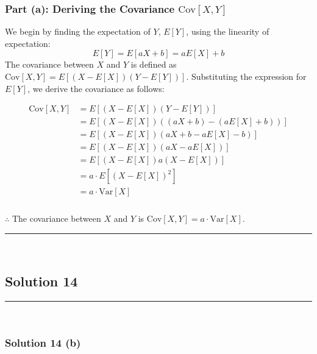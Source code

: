 \documentclass{article}
\begin{document}
\subsubsection*{Part (a): Deriving the Covariance $\text{Cov}[X, Y]$}
\parbox{\textwidth}{
We begin by finding the expectation of $Y$, $E[Y]$, using the linearity of expectation:
$$ E[Y] = E[aX + b] = aE[X] + b $$
The covariance between $X$ and $Y$ is defined as $\text{Cov}[X, Y] = E[(X - E[X])(Y - E[Y])]$. Substituting the expression for $E[Y]$, we derive the covariance as follows:
}
\begin{align*}
\text{Cov}[X, Y] &= E\left[ (X - E[X])(Y - E[Y]) \right] \\
&= E\left[ (X - E[X])((aX + b) - (aE[X] + b)) \right] \\
&= E\left[ (X - E[X])(aX + b - aE[X] - b) \right] \\
&= E\left[ (X - E[X])(aX - aE[X]) \right] \\
&= E\left[ (X - E[X])a(X - E[X]) \right] \\
&= a \cdot E\left[ (X - E[X])^2 \right] \\
&= a \cdot \text{Var}[X]
\end{align*}

\subsubsection*{\normalfont}{$\therefore$ The covariance between $X$ and $Y$ is $\text{Cov}[X, Y] = a \cdot \text{Var}[X]$.}


\noindent\rule{\textwidth}{0.4pt}\\

\newpage

\subsection*{Solution 14}
\noindent\rule{\textwidth}{0.4pt}\\
\subsubsection*{Solution  14 (b)}
\end{document}

